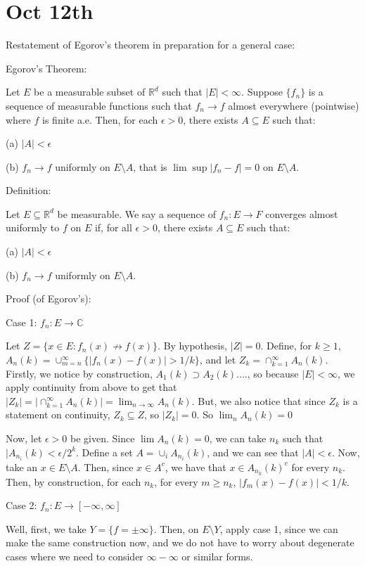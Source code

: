 \documentclass[10pt]{article}
\begin{document}
\section*{Oct 12th}

Restatement of Egorov’s theorem in preparation for a general case: 

Egorov’s Theorem:

Let $E$ be a measurable subset of $\mathbb{R}^d$ such that $|E| < \infty$. Suppose $\{ f_n \}$ is a sequence of measurable functions such that $f_n \to f$ almost everywhere (pointwise) where $f$ is finite a.e. Then, for each $\epsilon > 0$, there exists $A \subseteq E$ such that:

(a) $|A| < \epsilon$

(b) $f_n \to f$ uniformly on $E \setminus A$, that is $\lim \sup |f_n -f | = 0$ on $E \setminus A$.

Definition:

Let $E \subseteq \mathbb{R}^d$ be measurable. We say a sequence of $f_n: E \to F$ converges almost uniformly to $f$ on $E$ if, for all $\epsilon > 0$, there exists $A \subseteq E$ such that:

(a) $|A| < \epsilon$

(b) $f_n \to f$ uniformly on $E \setminus A$.

Proof (of Egorov’s):

Case 1: $f_n: E \to \mathbb{C}$

Let $Z  = \{ x \in E : f_n(x) \not \to f(x) \}$. By hypothesis, $|Z| = 0$. Define, for $k \geq 1$, $A_n(k) = \cup_{m=n}^\infty \{ |f_n(x) - f(x) | > 1/k \}$, and let $Z_k = \cap_{k=1}^\infty A_n(k)$. Firstly, we notice by construction, $A_1(k) \supset A_2(k) ....$, so because $|E| < \infty$, we apply continuity from above to get that $|Z_k|  = |\cap_{k=1}^\infty A_n(k)| = \lim_{n \to \infty} A_n(k)$. But, we also notice that since $Z_k$ is a statement on continuity, $Z_k \subseteq Z$, so $|Z_k| = 0$. So $\lim_n A_n(k) = 0$

Now, let $\epsilon > 0$ be given. Since $\lim A_n(k) = 0$, we can take $n_k$ such that $|A_{n_i}(k) < \epsilon/2^k$. Define a set $A = \cup_i A_{n_i}(k)$, and we can see that $|A| < \epsilon$. Now, take an $x \in E \setminus A$. Then, since $x \in A^c$, we have that $x \in A_{n_k}(k)^c$ for every $n_k$. Then, by construction, for each $n_k$, for every $m \geq n_k$, $|f_m(x) - f(x)| < 1/k$.

Case 2: $f_n: E \to [-\infty,\infty]$

Well, first, we take $Y = \{ f = \pm \infty \}$. Then, on $E \setminus Y$, apply case 1, since we can make the same construction now, and we do not have to worry about degenerate cases where we need to consider $\infty - \infty$ or similar forms.
\end{document}
